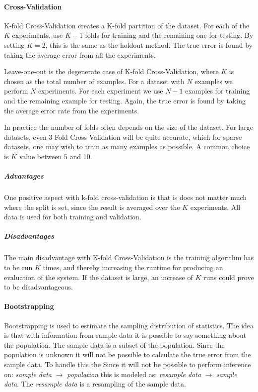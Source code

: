 \paragraph{Cross-Validation}
K-fold Cross-Validation creates a K-fold partition of the dataset. For each of
the $K$ experiments, use $K-1$ folds for training and the remaining one for
testing. By setting $K=2$, this is the same as the holdout method. The true
error is found by taking the average error from all the experiments.

Leave-one-out is the degenerate case of K-fold Cross-Validation, where $K$ is
chosen as the total number of examples. For a dataset with $N$ examples we
perform $N$ experiments. For each experiment we use $N-1$ examples for training
and the remaining example for testing. Again, the true error is found by taking
the average error rate from the experiments.

In practice the number of folds often depends on the size of the dataset. For
large datasets, even 3-Fold Cross Validation will be quite accurate, which for
sparse datasets, one may wish to train as many examples as possible. A common
choice is $K$ value between 5 and 10.

\subparagraph{Advantages}
One positive aspect with k-fold cross-validation is that is does not matter much where the split is set, since the result is averaged over the $K$ experiments.
All data is used for both training and validation.

\subparagraph{Disadvantages}
The main disadvantage with K-fold Cross-Validation is the training algorithm has to be run $K$ times, and thereby increasing the runtime for producing an evaluation of the system.
If the dataset is large, an increase of $K$ runs could prove to be disadvantageous.

\paragraph{Bootstrapping~\cite{efron1994introduction}}
Bootstrapping is used to estimate the sampling distribution of statistics. %
The idea is that with information from sample data it is possible to say something about the population.
The sample data is a subset of the population.
Since the population is unknown it will not be possible to calculate the true error from the sample data.
To handle this the
Since it will not be possible to perform inference on:
\emph{sample data} $\rightarrow$ \emph{population} this is modeled as:
\emph{resample data} $\rightarrow$ \emph{sample data}.
The \emph{resample data} is a resampling of the sample data.

